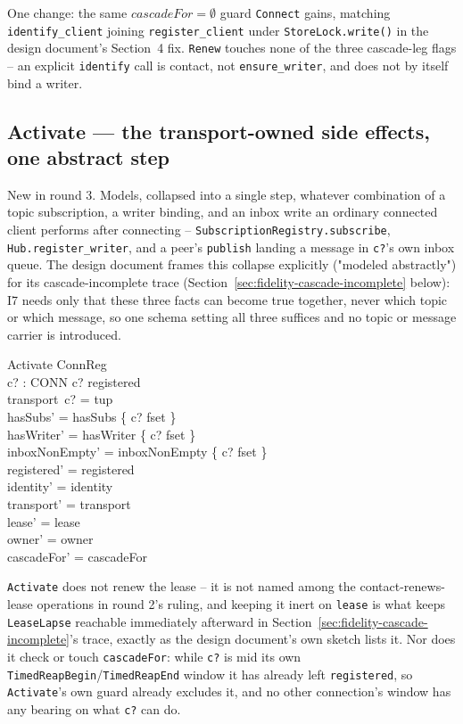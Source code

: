 \documentclass[a4paper,10pt,fleqn]{article}
\begin{document}
One change: the same \texttt{$cascadeFor = \emptyset$} guard \texttt{Connect}
gains, matching \texttt{identify\_client} joining \texttt{register\_client}
under \texttt{StoreLock.write()} in the design document's Section~4 fix.
\texttt{Renew} touches none of the three cascade-leg flags -- an explicit
\texttt{identify} call is contact, not \texttt{ensure\_writer}, and does not
by itself bind a writer.

\subsection{Activate --- the transport-owned side effects, one abstract step}
\label{sec:activate}

New in round 3. Models, collapsed into a single step, whatever combination
of a topic subscription, a writer binding, and an inbox write an ordinary
connected client performs after connecting -- \texttt{SubscriptionRegistry.subscribe},
\texttt{Hub.register\_writer}, and a peer's \texttt{publish} landing a
message in \texttt{c?}'s own inbox queue. The design document frames this
collapse explicitly ("modeled abstractly") for its cascade-incomplete
trace (Section~\ref{sec:fidelity-cascade-incomplete} below): I7 needs only
that these three facts can become true together, never which topic or
which message, so one schema setting all three suffices and no topic or
message carrier is introduced.

\begin{schema}{Activate}
  \Delta ConnReg \\
  c? : CONN
\where
  c? \in registered \\
  transport~c? = tup \\
  hasSubs' = hasSubs \oplus \{ c? \mapsto fset \} \\
  hasWriter' = hasWriter \oplus \{ c? \mapsto fset \} \\
  inboxNonEmpty' = inboxNonEmpty \oplus \{ c? \mapsto fset \} \\
  registered' = registered \\
  identity' = identity \\
  transport' = transport \\
  lease' = lease \\
  owner' = owner \\
  cascadeFor' = cascadeFor
\end{schema}

\texttt{Activate} does not renew the lease -- it is not named among the
contact-renews-lease operations in round 2's ruling, and keeping it inert on
\texttt{lease} is what keeps \texttt{LeaseLapse} reachable immediately
afterward in Section~\ref{sec:fidelity-cascade-incomplete}'s trace, exactly
as the design document's own sketch lists it. Nor does it check or touch
\texttt{cascadeFor}: while \texttt{c?} is mid its own
\texttt{TimedReapBegin}/\texttt{TimedReapEnd} window it has already left
\texttt{registered}, so \texttt{Activate}'s own guard already excludes it,
and no other connection's window has any bearing on what \texttt{c?} can do.
\end{document}
